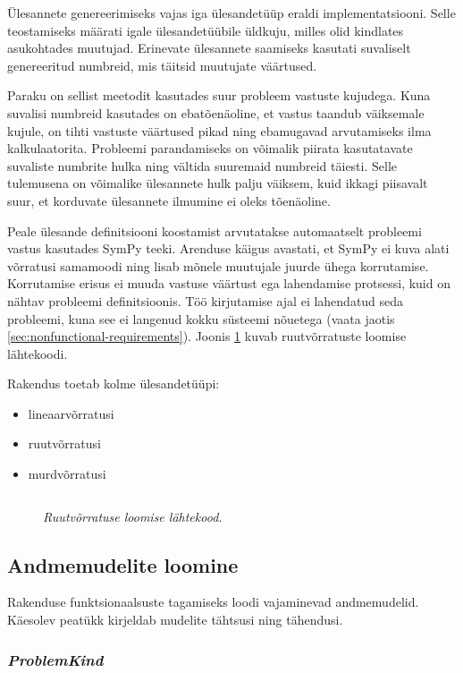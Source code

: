 Ülesannete genereerimiseks vajas iga ülesandetüüp eraldi implementatsiooni. Selle teostamiseks määrati igale ülesandetüübile üldkuju, milles olid kindlates asukohtades muutujad. Erinevate ülesannete saamiseks kasutati suvaliselt genereeritud numbreid, mis täitsid muutujate väärtused.

Paraku on sellist meetodit kasutades suur probleem vastuste kujudega. Kuna suvalisi numbreid kasutades on ebatõenäoline, et vastus taandub väiksemale kujule, on tihti vastuste väärtused pikad ning ebamugavad arvutamiseks ilma kalkulaatorita. Probleemi parandamiseks on võimalik piirata kasutatavate suvaliste numbrite hulka ning vältida suuremaid numbreid täiesti. Selle tulemusena on võimalike ülesannete hulk palju väiksem, kuid ikkagi piisavalt suur, et korduvate ülesannete ilmumine ei oleks tõenäoline.

Peale ülesande definitsiooni koostamist arvutatakse automaatselt probleemi vastus kasutades SymPy teeki. Arenduse käigus avastati, et SymPy ei kuva alati võrratusi samamoodi ning lisab mõnele muutujale juurde ühega korrutamise. Korrutamise erisus ei muuda vastuse väärtust ega lahendamise protsessi, kuid on nähtav probleemi definitsioonis. Töö kirjutamise ajal ei lahendatud seda probleemi, kuna see ei langenud kokku süsteemi nõuetega (vaata jaotis \ref{sec:nonfunctional-requirements}). Joonis \ref{fig:maths} kuvab ruutvõrratuste loomise lähtekoodi.

Rakendus toetab kolme ülesandetüüpi:
\begin{itemize}
  \item lineaarvõrratusi
  \item ruutvõrratusi
  \item murdvõrratusi
\end{itemize}

\begin{figure}
\inputminted[breaklines]{py}{chapters/data/maths.py}
\caption{\emph{Ruutvõrratuse loomise lähtekood.}}\label{fig:maths}
\end{figure}

\subsection{Andmemudelite loomine}

Rakenduse funktsionaalsuste tagamiseks loodi vajaminevad andmemudelid. Käesolev peatükk kirjeldab mudelite tähtsusi ning tähendusi.

\subsubsection{\emph{ProblemKind}}

